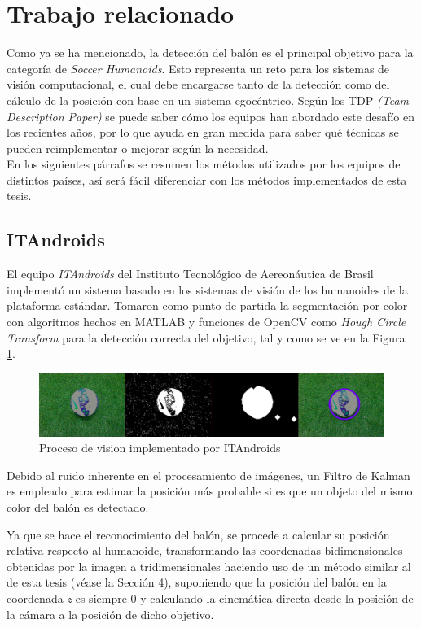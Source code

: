 	\section{Trabajo relacionado}
	
	Como ya se ha mencionado, la detección del balón es el principal objetivo para la categoría de \textit{Soccer Humanoids}. Esto representa un reto para los sistemas de visión computacional, el cual debe encargarse tanto de la detección como del cálculo de la posición con base en un sistema egocéntrico. Según los TDP \textit{(Team Description Paper)} se puede saber cómo los equipos han abordado este desafío en los recientes años, por lo que ayuda en gran medida para saber qué técnicas se pueden reimplementar o mejorar según la necesidad. 
\\	

	En los siguientes párrafos se resumen los métodos utilizados por los equipos de distintos países, así será fácil diferenciar con los métodos implementados de esta tesis.
	
	\subsection*{ITAndroids}
	El equipo \textit{ITAndroids} del Instituto Tecnológico de Aereonáutica de Brasil implementó un sistema basado en los sistemas de visión de los humanoides de la plataforma estándar. Tomaron como punto de partida la segmentación por color con algoritmos hechos en MATLAB y funciones de OpenCV como \textit{Hough Circle Transform} para la detección correcta del objetivo, tal y como se ve en la Figura \ref{fig:ITAndroids_vision}.
	
\begin{figure}
\centering
\includegraphics[scale=0.25]{images/ITAndroids_vision.png}
\caption{Proceso de vision implementado por ITAndroids}
\label{fig:ITAndroids_vision}
\end{figure}

	Debido al ruido inherente en el procesamiento de imágenes, un Filtro de Kalman es empleado para estimar la posición más probable si es que un objeto del mismo color del balón es detectado.
	
	Ya que se hace el reconocimiento del balón, se procede a calcular su posición relativa respecto al humanoide, transformando las coordenadas bidimensionales obtenidas por la imagen a tridimensionales haciendo uso de un método similar al de esta tesis (véase la Sección 4), suponiendo que la posición del balón en la coordenada \textit{z} es siempre 0 y calculando la cinemática directa desde la posición de la cámara a la posición de dicho objetivo.
	
